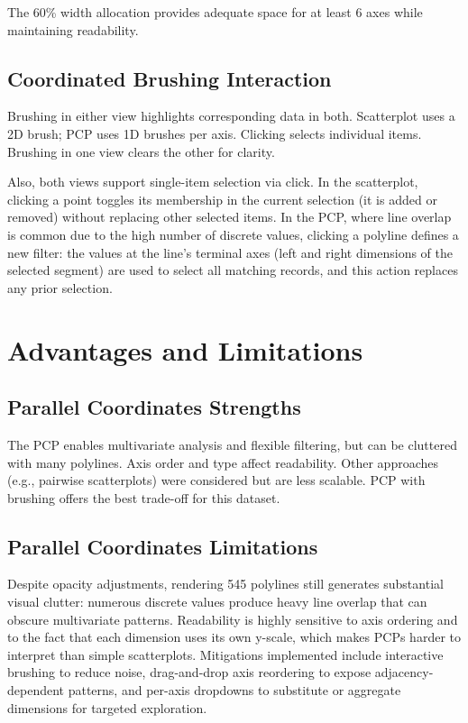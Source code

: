 \documentclass[10pt,a4paper]{article}
\begin{document}
The 60\% width allocation provides adequate space for at least 6 axes while maintaining readability.

\subsection{Coordinated Brushing Interaction}

Brushing in either view highlights corresponding data in both. Scatterplot uses a 2D brush; PCP uses 1D brushes per axis. Clicking selects individual items. Brushing in one view clears the other for clarity.

Also, both views support single-item selection via click. In the scatterplot, clicking a point toggles its membership in the current selection (it is added or removed) without replacing other selected items. In the PCP, where line overlap is common due to the high number of discrete values, clicking a polyline defines a new filter: the values at the line's terminal axes (left and right dimensions of the selected segment) are used to select all matching records, and this action replaces any prior selection.

\section{Advantages and Limitations}

\subsection{Parallel Coordinates Strengths}
The PCP enables multivariate analysis and flexible filtering, but can be cluttered with many polylines. Axis order and type affect readability. Other approaches (e.g., pairwise scatterplots) were considered but are less scalable. PCP with brushing offers the best trade-off for this dataset.

\subsection{Parallel Coordinates Limitations}
Despite opacity adjustments, rendering 545 polylines still generates substantial visual clutter: numerous discrete values produce heavy line overlap that can obscure multivariate patterns. Readability is highly sensitive to axis ordering and to the fact that each dimension uses its own y-scale, which makes PCPs harder to interpret than simple scatterplots. Mitigations implemented include interactive brushing to reduce noise, drag-and-drop axis reordering to expose adjacency-dependent patterns, and per-axis dropdowns to substitute or aggregate dimensions for targeted exploration.
\end{document}
